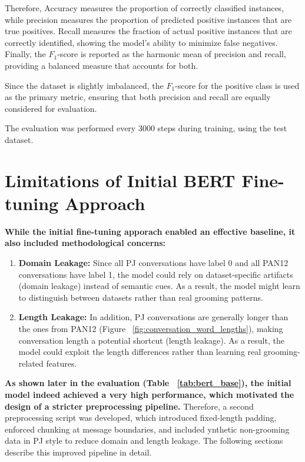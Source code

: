 Therefore, Accuracy measures the proportion of correctly classified instances, while precision measures the proportion of predicted positive instances that are true positives. 
Recall measures the fraction of actual positive instances that are correctly identified, showing the model's ability to minimize false negatives. 
Finally, the $F_{1}$-score is reported as the harmonic mean of precision and recall, providing a balanced measure that accounts for both. 

Since the dataset is slightly imbalanced, the $F_{1}$-score for the positive class is used as the primary metric, ensuring that both precision and recall are equally considered for evaluation.

The evaluation was performed every 3000 steps during training, using the test dataset.


\section{Limitations of Initial BERT Fine-tuning Approach}

\textbf{While the initial fine-tuning apporach enabled an effective baseline, it also included methodological concerns:}
\begin{enumerate}
  \item \textbf{Domain Leakage:} Since all PJ conversations have label 0 and all PAN12 conversations have label 1, the model could rely on dataset-specific artifacts (domain leakage) instead of semantic cues. As a result, the model might learn to distinguish between datasets rather than real grooming patterns.
  \item \textbf{Length Leakage:} In addition, PJ conversations are generally longer than the ones from PAN12 (Figure ~\ref{fig:conversation_word_lengths}), making conversation length a potential shortcut (length leakage). As a result, the model could exploit the length differences rather than learning real grooming-related features.
\end{enumerate}

\textbf{As shown later in the evaluation (Table ~\ref{tab:bert_base}), the initial model indeed achieved a very high performance, which motivated the design of a stricter preprocessing pipeline.} Therefore, a second preprocessing script was developed, which introduced fixed-length padding, enforced chunking at message boundaries, and included ynthetic non-grooming data in PJ style to reduce domain and length leakage. The following sections describe this improved pipeline in detail.

